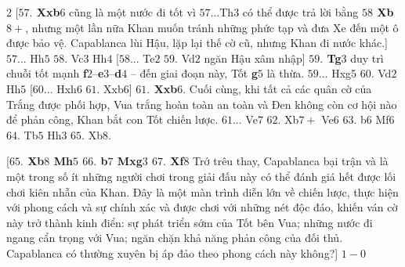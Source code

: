 \begin{multicols}{2}
	[\textbf{\color{gocco}$57.$ Xxb$6$} cũng là một nước đi tốt vì $57$...Th$3$ có thể được trả lời bằng \textbf{\color{gocco}$58$ Xb$8+$}, nhưng một lần nữa Khan muốn tránh những phức tạp và đưa Xe đến một ô được bảo vệ. Capablanca lùi Hậu, lặp lại thế cờ cũ, nhưng Khan đi nước khác.]
	\vskip 0.1cm
	$57$... Hh$5$ $58.$ Vc$3$ Hh$4$
	\vskip 0.1cm
	[$58$... Te$2$ $59.$ Vd$2$ ngăn Hậu xâm nhập]
	\vskip 0.1cm
	\textbf{\color{gocco}$59.$ Tg$3$} duy trì chuỗi tốt mạnh \textbf{\color{gocco}f}$2$--\textbf{\color{gocco}e}$3$--\textbf{\color{gocco}d}$4$ -- đến giai đoạn này, Tốt \textbf{\color{gocco}g}$5$ là thừa.
	\vskip 0.1cm
	$59$... Hxg$5$ $60.$ Vd$2$ Hh$5$
	\vskip 0.1cm
	[$60$... Hxh$6$ $61.$ Xxb$6$]
	\vskip 0.1cm
	\textbf{\color{gocco}$61.$ Xxb$6$}. Cuối cùng, khi tất cả các quân cờ của Trắng được phối hợp, Vua trắng hoàn toàn an toàn và Đen không còn cơ hội nào để phản công, Khan bắt con Tốt chiến lược. $61$... Ve$7$ $62.$ Xb$7+$ Ve$6$ $63.$ b$6$ Mf$6$ $64.$ Tb$5$ Hh$3$ $65.$ Xb$8$.
	\begin{center}
		\newgame
		\scalebox{0.9}\showboard
	\end{center}
	[\textbf{\color{gocco}$65.$ Xb$8$ Mh$5$ $66.$ b$7$ Mxg$3$ $67.$ Xf$8$} Trớ trêu thay, Capablanca bại trận và là một trong số ít những người chơi trong giải đấu này có thể đánh giá hết được lối chơi kiên nhẫn của Khan. Đây là một màn trình diễn lớn về chiến lược, thực hiện với phong cách và sự chính xác và được chơi với những nét độc đáo, khiến ván cờ này  trở thành kinh điển: sự phát triển sớm của Tốt bên Vua; những nước đi ngang cẩn trọng với Vua; ngăn chặn khả năng phản công của đối thủ. Capablanca có thường xuyên bị áp đảo theo phong cách này không?]
	\vskip 0.1cm
	$1-0$
\end{multicols}




